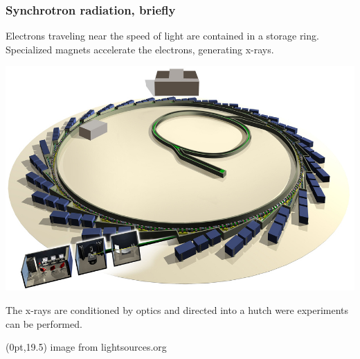 \documentclass[10pt, xcolor=x11names, compress]{beamer}
\begin{document}
\begin{frame}
  \frametitle{Synchrotron radiation, briefly}

  \begin{center}
    \small
    Electrons traveling near the speed of light are contained in a
    storage ring.  Specialized magnets accelerate the electrons,
    generating x-rays.

    \smallskip

    \includegraphics[width=0.8\linewidth]{pses/DLS008h_sm.jpg}

    \smallskip

    The x-rays are conditioned by optics and directed into a
    hutch were experiments can be performed.
  \end{center}
  \begin{textblock*}{0.5\linewidth}(0pt,19.5\TPVertModule) 
    \tiny
    image from lightsources.org
  \end{textblock*}
\end{frame}
\end{document}
